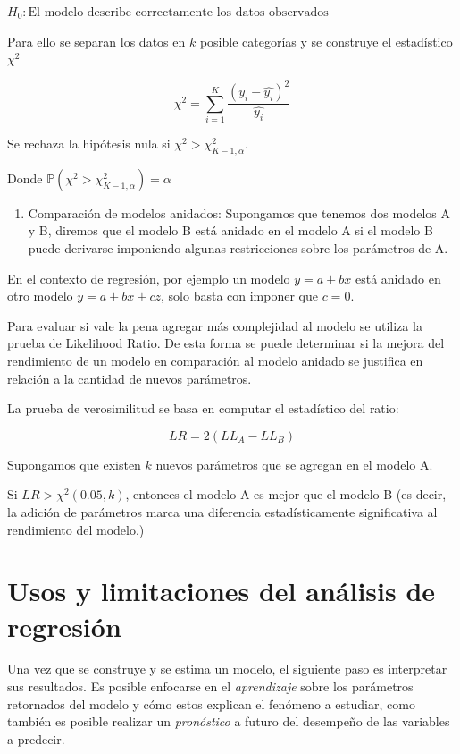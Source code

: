 \documentclass[
]{book}
\providecommand{\tightlist}{%
  \setlength{\itemsep}{0pt}\setlength{\parskip}{0pt}}
\begin{document}
\(H_0: \text{El modelo describe correctamente los datos observados}\)

Para ello se separan los datos en \(k\) posible categorías y se construye
el estadístico \(\chi^2\)

\[\chi^2 = \sum_{i = 1}^{K} \frac{(y_i - \hat{y_i})^2}{\hat{y_i}}\]

Se rechaza la hipótesis nula si \(\chi^2 > \chi^{2}_{K-1, α}\).

Donde \(\mathbb{P}(\chi^2 > \chi^{2}_{K-1, α}) = α\)

\begin{enumerate}
\def\labelenumi{\arabic{enumi}.}
\setcounter{enumi}{1}
\tightlist
\item
  Comparación de modelos anidados: Supongamos que tenemos dos modelos
  A y B, diremos que el modelo B está anidado en el modelo A si el
  modelo B puede derivarse imponiendo algunas restricciones sobre los
  parámetros de A.
\end{enumerate}

En el contexto de regresión, por ejemplo un modelo \(y=a+bx\) está anidado
en otro modelo \(y=a+bx+cz\), solo basta con imponer que \(c=0\).

Para evaluar si vale la pena agregar más complejidad al modelo se
utiliza la prueba de Likelihood Ratio. De esta forma se puede determinar
si la mejora del rendimiento de un modelo en comparación al modelo
anidado se justifica en relación a la cantidad de nuevos parámetros.

La prueba de verosimilitud se basa en computar el estadístico del ratio:

\[LR = 2(LL_A - LL_B)\]

Supongamos que existen \(k\) nuevos parámetros que se agregan en el modelo
A.

Si \(LR > \chi^2(0.05, k)\), entonces el modelo A es mejor que el modelo B
(es decir, la adición de parámetros marca una diferencia
estadísticamente significativa al rendimiento del modelo.)

\hypertarget{usos-y-limitaciones-del-anuxe1lisis-de-regresiuxf3n}{%
\section{Usos y limitaciones del análisis de regresión}\label{usos-y-limitaciones-del-anuxe1lisis-de-regresiuxf3n}}

Una vez que se construye y se estima un modelo, el siguiente paso es
interpretar sus resultados. Es posible enfocarse en el \emph{aprendizaje}
sobre los parámetros retornados del modelo y cómo estos explican el
fenómeno a estudiar, como también es posible realizar un \emph{pronóstico} a
futuro del desempeño de las variables a predecir.
\end{document}
